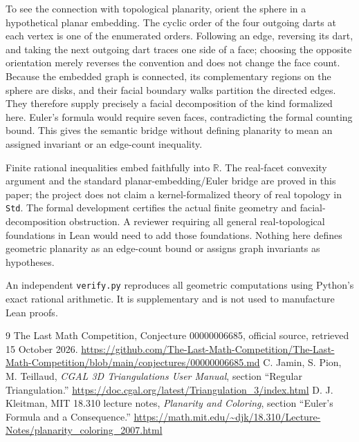 \documentclass[11pt]{article}
\begin{document}
To see the connection with topological planarity, orient the sphere in a hypothetical planar embedding. The cyclic order of the four outgoing darts at each vertex is one of the enumerated orders. Following an edge, reversing its dart, and taking the next outgoing dart traces one side of a face; choosing the opposite orientation merely reverses the convention and does not change the face count. Because the embedded graph is connected, its complementary regions on the sphere are disks, and their facial boundary walks partition the directed edges. They therefore supply precisely a facial decomposition of the kind formalized here. Euler's formula would require seven faces, contradicting the formal counting bound. This gives the semantic bridge without defining planarity to mean an assigned invariant or an edge-count inequality.

Finite rational inequalities embed faithfully into $\mathbb R$. The real-facet convexity argument and the standard planar-embedding/Euler bridge are proved in this paper; the project does not claim a kernel-formalized theory of real topology in \texttt{Std}. The formal development certifies the actual finite geometry and facial-decomposition obstruction. A reviewer requiring all general real-topological foundations in Lean would need to add those foundations. Nothing here defines geometric planarity as an edge-count bound or assigns graph invariants as hypotheses.

An independent \texttt{verify.py} reproduces all geometric computations using Python's exact rational arithmetic. It is supplementary and is not used to manufacture Lean proofs.

\begin{thebibliography}{9}
\small
\setlength{\itemsep}{0pt}
 The Last Math Competition, Conjecture 00000006685, official source, retrieved 15 October 2026.\newline
\url{https://github.com/The-Last-Math-Competition/The-Last-Math-Competition/blob/main/conjectures/00000006685.md}
 C. Jamin, S. Pion, M. Teillaud, \emph{CGAL 3D Triangulations User Manual}, section ``Regular Triangulation.''\newline
\url{https://doc.cgal.org/latest/Triangulation_3/index.html}
 D. J. Kleitman, MIT 18.310 lecture notes, \emph{Planarity and Coloring}, section ``Euler's Formula and a Consequence.''\newline
\url{https://math.mit.edu/~djk/18.310/Lecture-Notes/planarity_coloring_2007.html}
\end{thebibliography}
\end{document}
